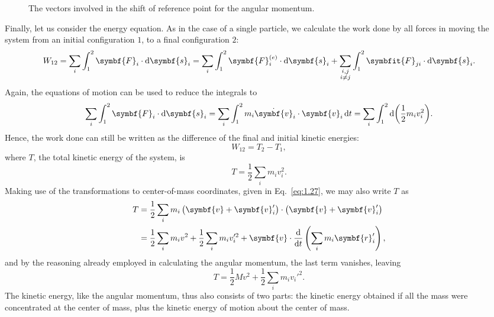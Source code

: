 \begin{figure}[htbp]
    \centering
    \caption{The vectors involved in the shift of reference point for the angular momentum.}
    \label{fig:1.3}
\end{figure}

Finally, let us consider the energy equation. As in the case of a single particle, we calculate the work done by all forces in moving the system from an initial configuration \(1\), to a final configuration \(2\):
\begin{equation}
    W_{12}=\sum_i\int_1^2\symbf{F}_i\cdot\odif{\symbf{s}_i}=\sum_i\int_1^2\symbf{F}_i^{\left(e\right)}\cdot\odif{\symbf{s}_i}+\sum_{\substack{i,j\\i\ne j}}\int_1^2\symbfit{F}_{ji}\cdot\odif{\symbf{s}_i}.\label{eq:1.29}
\end{equation}
Again, the equations of motion can be used to reduce the integrals to
\begin{equation*}
    \sum_i\int_1^2\symbf{F}_i\cdot\odif{\symbf{s}_i}=\sum_i\int_1^2m_i\dot{\symbf{v}}_i\cdot\symbf{v}_i\odif{t}=\sum_i\int_1^2\odif{\left(\frac{1}{2}m_iv_i^2\right)}.
\end{equation*}
Hence, the work done can still be written as the difference of the final and initial kinetic energies:
\begin{equation*}
    W_{12}=T_2-T_1,
\end{equation*}
where \(T\), the total kinetic energy of the system, is
\begin{equation}
    T=\frac{1}{2}\sum_im_iv_i^2.
\end{equation}
Making use of the transformations to center-of-mass coordinates, given in Eq.~\eqref{eq:1.27}, we may also write \(T\) as
\begin{align*}
    T&=\frac{1}{2}\sum_im_i\left(\symbf{v}+\symbf{v}_i'\right)\cdot\left(\symbf{v}+\symbf{v}_i'\right)\\
    &=\frac{1}{2}\sum_im_iv^2+\frac{1}{2}\sum_im_iv_i'^2+\symbf{v}\cdot\odv*{\left(\sum_im_i\symbf{r}_i'\right)}{t},
\end{align*}
and by the reasoning already employed in calculating the angular momentum, the last term vanishes, leaving 
\begin{equation}
    T=\frac{1}{2}Mv^2+\frac{1}{2}\sum_im_iv_i'^2.
\end{equation}
The kinetic energy, like the angular momentum, thus also consists of two parts: the kinetic energy obtained if all the mass were concentrated at the center of mass, plus the kinetic energy of motion about the center of mass.

